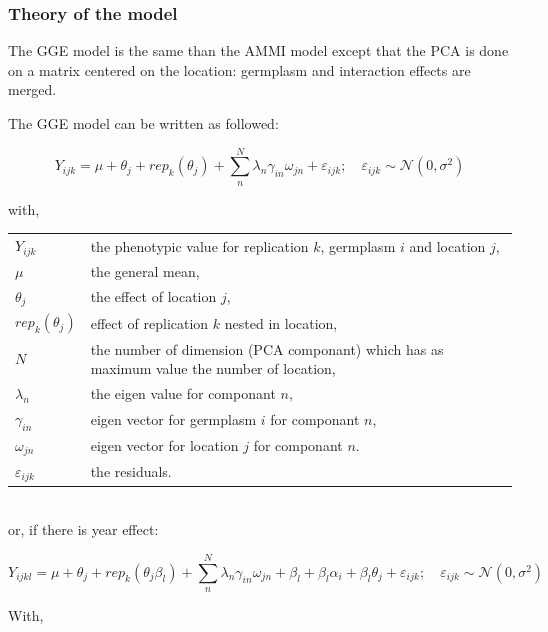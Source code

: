 \documentclass{article}\usepackage[]{graphicx}\usepackage[]{color}
\begin{document}
\subsubsection{Theory of the model}

The GGE model is the same than the AMMI model except that the PCA is done on a matrix centered on the location: germplasm and interaction effects are merged.

The GGE model can be written as followed:

\begin{equation}
Y_{ijk} = \mu + \theta_{j} + rep_{k}(\theta_{j}) + \sum_{n}^{N} \lambda_{n} \gamma_{in} \omega_{jn} + \varepsilon_{ijk}; \quad \varepsilon_{ijk} \sim \mathcal{N} (0,\sigma^2)
\label{modele_gge}
\end{equation}

with,

\begin{tabular}{ll}
$Y_{ijk}$ & the phenotypic value for replication $k$, germplasm $i$ and location $j$,\\
$\mu$ & the general mean,\\
$\theta_{j}$ & the effect of location $j$,\\
$rep_{k}(\theta_{j})$ & effect of replication $k$ nested in location,\\
$N$ & the number of dimension (PCA componant) which has as maximum value the number of location,\\
$\lambda_{n}$ & the eigen value for componant $n$,\\
$\gamma_{in}$ & eigen vector for germplasm $i$ for componant $n$,\\
$\omega_{jn}$ & eigen vector for  location $j$  for componant $n$.\\
$\varepsilon_{ijk}$ & the residuals.\\
\end{tabular}

~\\

or, if there is year effect:


\begin{equation}
Y_{ijkl} = \mu + \theta_{j} + rep_{k}(\theta_{j}\beta_{l}) +\sum_{n}^{N} \lambda_{n} \gamma_{in} \omega_{jn} + 
\beta_{l} + \beta_{l}\alpha_{i} + \beta_{l}\theta_{j} + 
\varepsilon_{ijk}; \quad \varepsilon_{ijk} \sim \mathcal{N} (0,\sigma^2)
\label{ammi_anova}
\end{equation}

With,
\end{document}
